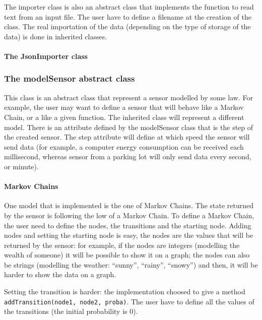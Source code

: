 The importer class is also an abstract class that implements the function to read text from an input file. The user have to define a filename at the creation of the class. The real importation of the data (depending on the type of storage of the data) is done in inherited classes.

\paragraph{The JsonImporter class}




\subsubsection{The modelSensor abstract class}

This class is an abstract class that represent a sensor modelled by some law. For example, the user may want to define a sensor that will behave like a Markov Chain, or a like a given function. The inherited class will represent a different model. There is an attribute defined by the modelSensor class that is the step of the created sensor. The step attribute will define at which speed the sensor will send data (for example, a computer energy consumption can be received each millisecond, whereas sensor from a parking lot will only send data every second, or minute).

\paragraph{Markov Chains}

One model that is implemented is the one of Markov Chains. The state returned by the sensor is following the low of a Markov Chain. To define a Markov Chain, the user need to define the nodes, the transitions and the starting node. Adding nodes and setting the starting node is easy, the nodes are the values that will be returned by the sensor: for example, if the nodes are integers (modelling the wealth of someone) it will be possible to show it on a graph; the nodes can also be strings (modelling the weather: ``sunny'', ``rainy'', ``snowy'') and then, it will be harder to show the data on a graph.

Setting the transition is harder: the implementation choosed to give a method \verb!addTransition(node1, node2, proba)!. The user have to define all the values of the transitions (the initial probability is 0).

